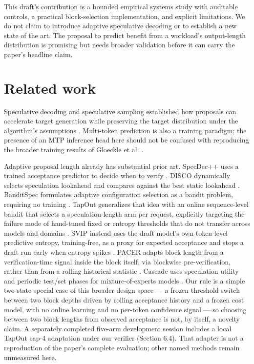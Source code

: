 \documentclass[
  11pt,
]{article}
\begin{document}
This draft's contribution is a bounded empirical systems study with
auditable controls, a practical block-selection implementation, and
explicit limitations. We do not claim to introduce adaptive speculative
decoding or to establish a new state of the art. The proposal to predict
benefit from a workload's output-length distribution is promising but
needs broader validation before it can carry the paper's headline claim.

\section{Related work}\label{related-work}

Speculative decoding and speculative sampling established how proposals
can accelerate target generation while preserving the target
distribution under the algorithm's assumptions
\citep{leviathan2023, chen2023}. Multi-token prediction is also a
training paradigm; the presence of an MTP inference head here should not
be confused with reproducing the broader training results of Gloeckle et
al. \citep{gloeckle2024}.

Adaptive proposal length already has substantial prior art. SpecDec++
uses a trained acceptance predictor to decide when to verify
\citep{huang2025}. DISCO dynamically selects speculation lookahead and
compares against the best static lookahead \citep{mamou2024}. BanditSpec
formulates adaptive configuration selection as a bandit problem,
requiring no training \citep{hou2025}. TapOut generalizes that idea with
an online sequence-level bandit that selects a speculation-length arm
per request, explicitly targeting the failure mode of hand-tuned fixed
or entropy thresholds that do not transfer across models and domains
\citep{sridhar2025tapout}. SVIP instead uses the draft model's own
token-level predictive entropy, training-free, as a proxy for expected
acceptance and stops a draft run early when entropy spikes
\citep{zhang2024svip}. PACER adapts block length from a
verification-time signal inside the block itself, via blockwise
pre-verification, rather than from a rolling historical statistic
\citep{zhang2026pacer}. Cascade uses speculation utility and periodic
test/set phases for mixture-of-experts models \citep{saxena2025}. Our
rule is a simple two-state special case of this broader design space ---
a frozen threshold switch between two block depths driven by rolling
acceptance history and a frozen cost model, with no online learning and
no per-token confidence signal --- so choosing between two block lengths
from observed acceptance is not, by itself, a novelty claim. A
separately completed five-arm development session includes a local
TapOut cap-4 adaptation under our verifier (Section 6.4). That adapter
is not a reproduction of the paper's complete evaluation; other named
methods remain unmeasured here.
\end{document}
